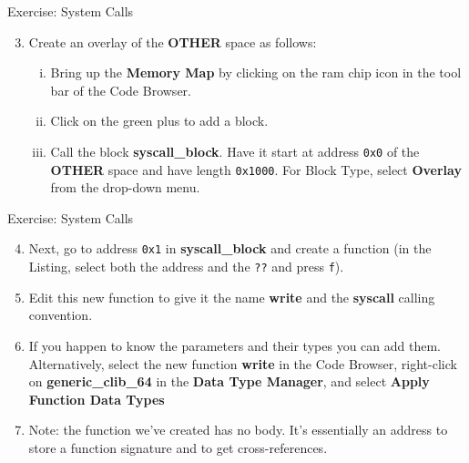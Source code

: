 \documentclass{beamer}
\begin{document}
\begin{frame}
\begin{block}{Exercise: System Calls}
\begin{enumerate}
\setcounter{enumi}{2}
\item Create an overlay of the \textbf{OTHER} space as follows:
\begin{enumerate}[(i)]
\item Bring up the \textbf{Memory Map} by clicking on the ram chip icon in the tool bar of the Code Browser.
\item Click on the green plus to add a block.
\item Call the block \textbf{syscall\_block}.  Have it start at address \texttt{0x0} of the \textbf{OTHER} space and have length \texttt{0x1000}.
For Block Type, select \textbf{Overlay} from the drop-down menu.
\end{enumerate}
\end{enumerate}
\end{block}
\end{frame}

\begin{frame}
\begin{block}{Exercise: System Calls}
\begin{enumerate}
\setcounter{enumi}{3}
\item Next, go to address \texttt{0x1} in \textbf{syscall\_block} and create a function (in the Listing, select both the address and the \texttt{??} and press \texttt{f}).
\item Edit this new function to give it the name \textbf{write} and the \textbf{syscall} calling convention.
\item If you happen to know the parameters and their types you can add them.  Alternatively, select the new function \textbf{write} in the Code Browser, right-click on 
\textbf{generic\_clib\_64} in the \textbf{Data Type Manager}, and select \textbf{Apply Function Data Types}
\item[] Note: the function we've created has no body. It's essentially an address to store a function signature and to get cross-references.
\end{enumerate}
\end{block}
\end{frame}
\end{document}
